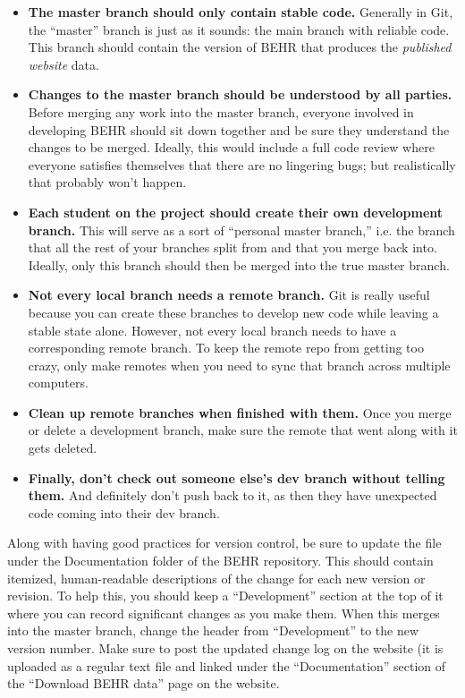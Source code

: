 \documentclass[12pt]{article}
\begin{document}
	\begin{itemize}
	\item \textbf{The master branch should only contain stable code.} Generally in Git, the ``master'' branch is just as it sounds: the main branch with reliable code. This branch should contain the version of BEHR that produces the \emph{published website} data.
	\item \textbf{Changes to the master branch should be understood by all parties.} Before merging any work into the master branch, everyone involved in developing BEHR should sit down together and be sure they understand the changes to be merged. Ideally, this would include a full code review where everyone satisfies themselves that there are no lingering bugs; but realistically that probably won't happen.
	\item \textbf{Each student on the project should create their own development branch.}  This will serve as a sort of ``personal master branch,'' i.e. the branch that all the rest of your branches split from and that you merge back into. Ideally, only this branch should then be merged into the true master branch.
	\item \textbf{Not every local branch needs a remote branch.} Git is really useful because you can create these branches to develop new code while leaving a stable state alone. However, not every local branch needs to have a corresponding remote branch.  To keep the remote repo from getting too crazy, only make remotes when you need to sync that branch across multiple computers.
	\item \textbf{Clean up remote branches when finished with them.} Once you merge or delete a development branch, make sure the remote that went along with it gets deleted.
	\item \textbf{Finally, don't check out someone else's dev branch without telling them.} And definitely don't push back to it, as then they have unexpected code coming into their dev branch.
	\end{itemize}
	
	Along with having good practices for version control, be sure to update the file  under the Documentation folder of the BEHR repository.  This should contain itemized, human-readable descriptions of the change for each new version or revision.  To help this, you should keep a ``Development'' section at the top of it where you can record significant changes as you make them.  When this merges into the master branch, change the header from ``Development'' to the new version number.  Make sure to post the updated change log on the website (it is uploaded as a regular text file and linked under the ``Documentation'' section of the ``Download BEHR data'' page on the website.
\end{document}
